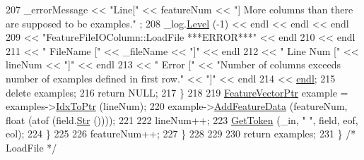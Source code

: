 \begin{DoxyCode}
207         \_errorMessage << \textcolor{stringliteral}{"Line["} << featureNum << \textcolor{stringliteral}{"]  More columns than there are supposed to be examples."}
      ;
208         \_log.\hyperlink{class_k_k_b_1_1_run_log_a32cf761d7f2e747465fd80533fdbb659}{Level} (-1) << endl << endl << endl
209                         << \textcolor{stringliteral}{"FeatureFileIOColumn::LoadFile    ***ERROR***"} << endl
210                         << endl
211                         << \textcolor{stringliteral}{"          FileName ["} << \_fileName << \textcolor{stringliteral}{"]"} << endl
212                         << \textcolor{stringliteral}{"          Line Num ["} << lineNum   << \textcolor{stringliteral}{"]"} << endl
213                         << \textcolor{stringliteral}{"          Error    ["} << \textcolor{stringliteral}{"Number of columns exceeds number of examples defined
       in first row."} << \textcolor{stringliteral}{"]"} << endl
214                         << \hyperlink{namespace_k_k_b_ad1f50f65af6adc8fa9e6f62d007818a8}{endl};
215         \textcolor{keyword}{delete} examples;
216         \textcolor{keywordflow}{return}  NULL;
217       \}
218 
219       \hyperlink{class_k_k_m_l_l_1_1_feature_vector}{FeatureVectorPtr} example = examples->\hyperlink{class_k_k_b_1_1_k_k_queue_acce2bdd8b3327e38266cf198382cd852}{IdxToPtr} (lineNum);
220       example->\hyperlink{class_k_k_m_l_l_1_1_feature_vector_abf364e3348c041cd7be6f14d6c4567cf}{AddFeatureData} (featureNum, \textcolor{keywordtype}{float} (atof (field.\hyperlink{class_k_k_b_1_1_k_k_str_ad574e6c0fe7f6ce1ba3ab0a8ce2fbd52}{Str} ())));
221 
222       lineNum++;
223       \hyperlink{class_k_k_m_l_l_1_1_feature_file_i_o_ae79ac82b32e63fa7e7d96c833b5631f2}{GetToken} (\_in, \textcolor{stringliteral}{" "}, field, eof, eol);
224     \}
225 
226     featureNum++;
227   \}
228 
229 
230   \textcolor{keywordflow}{return}  examples;
231 \}  \textcolor{comment}{/* LoadFile */}
\end{DoxyCode}
